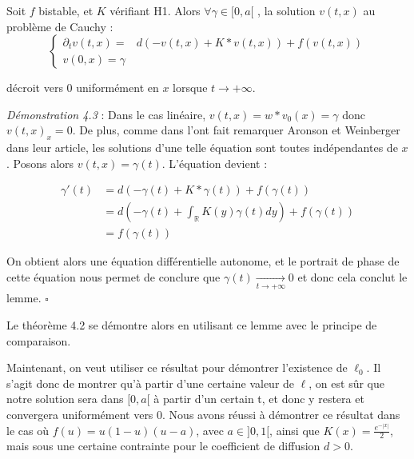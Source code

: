 \documentclass{article}
\begin{document}
\begin{Lemme}
Soit $f$ bistable, et $K$ vérifiant H1. Alors $\forall \gamma \in [0,a[$ , la solution $v(t,x)$ au problème de Cauchy :
\begin{equation}
\left\{
\begin{array}{cc}
\partial_t v (t,x) = & d(-v(t,x) + K*v(t,x)) + f(v(t,x))\\
v(0,x) = \gamma
\end{array}
\right.
\end{equation}

\noindent décroit vers 0 uniformément en $x$ lorsque $t \rightarrow +\infty$.
\end{Lemme}

\noindent \textit{Démonstration 4.3} : Dans le cas linéaire, $v(t,x) = w*v_0(x) = \gamma $ donc $v(t,x)_x = 0$. De plus, comme dans l'ont fait remarquer Aronson et Weinberger dans leur article, les solutions d'une telle équation sont toutes indépendantes de $x$. Posons alors $v(t,x) =\gamma(t) $. L'équation devient : 

\begin{equation*}
\begin{split}
\gamma '(t) & = d(-\gamma(t) + K*\gamma(t)) +  f(\gamma(t)) \\
& = d(-\gamma(t) + \int_{\mathbb{R}}K(y)\gamma(t)dy) +  f(\gamma(t)) \\
& = f(\gamma(t))
\end{split}
\end{equation*}

On obtient alors une équation différentielle autonome, et le portrait de phase de cette équation nous permet de conclure que $\gamma(t) \underset{t \to +\infty}{\longrightarrow}0$ et donc cela conclut le lemme. $\square$ \newline 

\noindent Le théorème 4.2 se démontre alors en utilisant ce lemme avec le principe de comparaison. \newline 

Maintenant, on veut utiliser ce résultat pour démontrer l'existence de $\ell_0$. Il s'agit donc de montrer qu'à partir d'une certaine valeur de $\ell$, on est sûr que notre solution sera dans $[0,a[$ à partir d'un certain t, et donc y restera et convergera uniformément vers 0. Nous avons réussi à démontrer ce résultat dans le cas où $f(u) = u(1-u)(u-a)$, avec $a \in ]0,1[$, ainsi que $K(x) = \frac{e^{-|x|}}{2}$, mais sous une certaine contrainte pour le coefficient de diffusion $d>0$. \newline 
\end{document}
